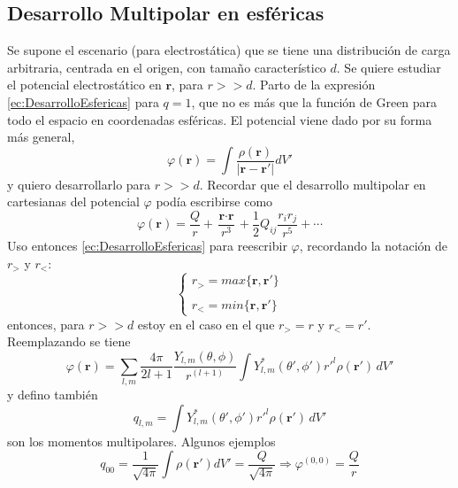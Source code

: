 \subsection{Desarrollo Multipolar en esféricas}
Se supone el escenario (para electrostática) que se tiene una distribución de carga arbitraria, centrada en el origen, con tamaño característico $d$. Se quiere estudiar el potencial electrostático en $\textbf{r}$, para $r >> d$. Parto de la expresión \eqref{ec:DesarrolloEsfericas} para $q = 1$, que no es más que la función de Green para todo el espacio en coordenadas esféricas. El potencial viene dado por su forma más general,
\begin{equation*}
    \varphi(\textbf{r}) = 
    \int \frac{\rho(\textbf{r})}{|\textbf{r}-\textbf{r}'|}dV'
\end{equation*}
y quiero desarrollarlo para $r>>d$. Recordar que el desarrollo multipolar en cartesianas del potencial $\varphi$ podía escribirse como
\begin{equation*}
    \varphi(\textbf{r}) =
    \frac{Q}{r} 
    + \frac{\textbf{r}\cdot\textbf{r}}{r^{3}}
    + \frac{1}{2}Q_{ij}\frac{r_{i}r_{j}}{r^{5}}
    + \cdots
\end{equation*}
Uso entonces \eqref{ec:DesarrolloEsfericas} para reescribir $\varphi$, recordando la notación de $r_{>}$ y $r_{<}$:
\begin{equation*}
    \left\{
        \begin{matrix}
            r_{>} = max\{\textbf{r},\textbf{r}' \}\\
            \\
            r_{<} = min\{\textbf{r},\textbf{r}' \}
        \end{matrix}
    \right.
\end{equation*}
entonces, para $r>>d$ estoy en el caso en el que $r_{>} = r$ y $r_{<} = r'$. Reemplazando se tiene
\begin{equation*}
    \varphi(\textbf{r}) = 
    \sum\limits_{l,m} \frac{4\pi}{2l + 1}
    \frac{Y_{l,m}(\theta,\phi)}{r^{(l+1)}}
    \int Y_{l,m}^{*}(\theta',\phi')r'^{l}\rho(\textbf{r}')\,dV'
\end{equation*}
y defino también 
\begin{equation*}
    q_{l,m} = \int Y_{l,m}^{*}(\theta',\phi')r'^{l}\rho(\textbf{r}')\,dV'
\end{equation*}
son los momentos multipolares. Algunos ejemplos
\begin{equation*}
    q_{00} = \frac{1}{\sqrt{4\pi}}\int\rho(\textbf{r}')dV'
    = \frac{Q}{\sqrt{4\pi}}
    \Longrightarrow \varphi^{(0,0)} = \frac{Q}{r}
\end{equation*}
